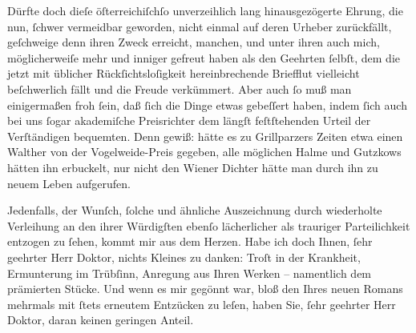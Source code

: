 \pstart
           Dürfte doch dieſe öſterreichiſchſo unverzeihlich lang hinausgezögerte Ehrung, die
               nun, ſchwer vermeidbar geworden, nicht einmal auf deren Urheber zurückfällt,
               geſchweige denn ihren Zweck erreicht, manchen, und unter ihren auch mich,
               möglicherweiſe mehr und inniger gefreut haben als den Geehrten ſelbſt, dem die jetzt
               mit üblicher Rückſichtsloſigkeit hereinbrechende Briefflut vielleicht beſchwerlich
               fällt {\pb}und die Freude verkümmert. Aber
               auch ſo muß man einigermaßen froh ſein, daß ſich die Dinge etwas gebeſſert haben,
               indem ſich auch bei uns ſogar akademiſche Preisrichter dem längſt feſtſtehenden
               Urteil der Verſtändigen bequemten. Denn gewiß: hätte es zu Grillparzers Zeiten etwa einen Walther von der Vogelweide-Preis gegeben, alle möglichen Halme und Gutzkows
               hätten ihn erbuckelt, nur nicht den Wiener Dichter hätte man durch ihn
               zu neuem Leben aufgerufen.\pend
           
\pstart
           Jedenfalls, der Wunſch, ſolche und ähnliche Auszeichnung durch wiederholte {\pb}Verleihung an den ihrer Würdigſten ebenſo
               lächerlicher als trauriger Parteilichkeit entzogen zu ſehen, kommt mir aus dem
               Herzen. Habe ich doch Ihnen, ſehr geehrter Herr Doktor, nichts Kleines zu danken:
               Troſt in der Krankheit, Ermunterung im Trübſinn, Anregung aus Ihren Werken –
               namentlich dem prämierten Stücke. Und wenn es mir gegönnt war, bloß den \label{K_L01751-2v}\label{K_L01751-2} Ihres neuen Romans mehrmals mit ſtets erneutem Entzücken zu leſen, haben Sie, ſehr
               geehrter Herr Doktor, daran keinen geringen Anteil.\pend
           
